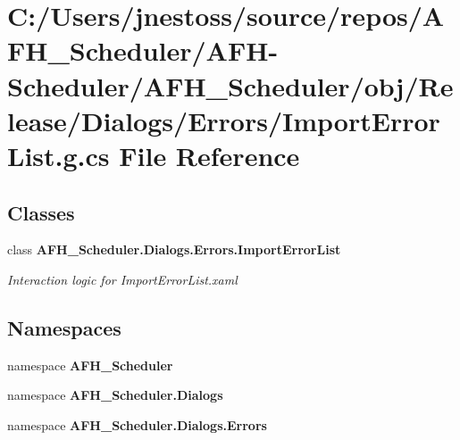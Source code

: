 \section{C\+:/\+Users/jnestoss/source/repos/\+A\+F\+H\+\_\+\+Scheduler/\+A\+F\+H-\/\+Scheduler/\+A\+F\+H\+\_\+\+Scheduler/obj/\+Release/\+Dialogs/\+Errors/\+Import\+Error\+List.g.\+cs File Reference}
\label{_release_2_dialogs_2_errors_2_import_error_list_8g_8cs}
\subsection*{Classes}
\begin{DoxyCompactItemize}
\item 
class \textbf{ A\+F\+H\+\_\+\+Scheduler.\+Dialogs.\+Errors.\+Import\+Error\+List}
\begin{DoxyCompactList}\small\item\em Interaction logic for Import\+Error\+List.\+xaml \end{DoxyCompactList}\end{DoxyCompactItemize}
\subsection*{Namespaces}
\begin{DoxyCompactItemize}
\item 
namespace \textbf{ A\+F\+H\+\_\+\+Scheduler}
\item 
namespace \textbf{ A\+F\+H\+\_\+\+Scheduler.\+Dialogs}
\item 
namespace \textbf{ A\+F\+H\+\_\+\+Scheduler.\+Dialogs.\+Errors}
\end{DoxyCompactItemize}

